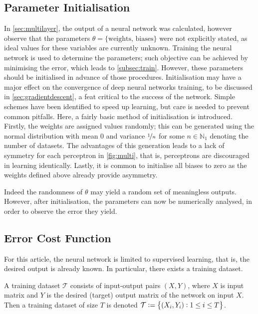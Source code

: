 \subsection{Parameter Initialisation}\label{sec:parinital}
In \autoref{sec:multilayer}, the output of a neural network was calculated, however observe that the parameters $\theta = \{\text{weights, biases}\}$ were not explicitly stated, as ideal values for these variables are currently unknown. Training the neural network is used to determine the parameters; such objective can be achieved by minimising the error, which leads to \autoref{subsec:train}. 
However, these parameters should be initialised in advance of those procedures. 
Initialisation may have a major effect on the convergence of deep neural networks training, to be discussed in \autoref{sec:gradientdescent}, a feat critical to the success of the network.
Simple schemes have been identified to speed up learning, but care is needed to prevent common pitfalls. Here, a fairly basic method of initialisation is introduced. 
Firstly, the weights are assigned values randomly; this can be generated using the normal distribution with mean $0$ and variance $\nicefrac{1}{n}$ for some $n\in\mathbb{N}_1$ denoting the number of datasets. The advantages of this generation leads to a lack of symmetry for each perceptron in \autoref{fig:multi}, that is, perceptrons are discouraged in learning identically. Lastly, it is common to initialise all biases to zero as the weights defined above already provide asymmetry. 

Indeed the randomness of $\theta$ may yield a random set of meaningless outputs. However, after initialisation, the parameters can now be numerically analysed, in order to observe the error they yield. 

\subsection{Error Cost Function}\label{subsec:train}
For this article, the neural network is limited to supervised learning, that is, the desired output is already known. In particular, there exists a training dataset.

\begin{defn}
A training dataset $\mathcal{T}$ consists of input-output pairs $(X,Y)$, where $X$ is input matrix and $Y$ is the desired (target) output matrix of the network on input $X$. Then a training dataset of size $T$ is denoted $\mathcal{T}:=\set{(X_i,Y_i):1\leq i \leq T}$.
\end{defn}

